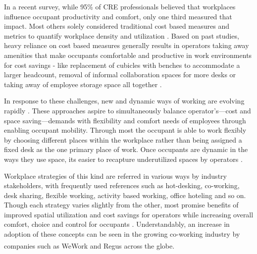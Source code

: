 \documentclass[]{interact}
\theoremstyle{plain}%
\theoremstyle{definition}
\theoremstyle{remark}
\begin{document}
In a recent survey, while 95\% of CRE professionals believed that workplaces influence occupant productivity and comfort, only one third measured that impact. Most others solely considered traditional cost based measures and metrics to quantify workplace density and utilization \citep{gensler}. Based on past studies, heavy reliance on cost based measures generally results in operators taking away amenities that make occupants comfortable and productive in work environments for cost savings - like replacement of cubicles with benches to accommodate a larger headcount, removal of informal collaboration spaces for more desks or taking away of employee storage space all together \citep{cbre}.

 

In response to these challenges, new and dynamic ways of working are evolving rapidly . These approaches aspire to simultaneously balance operator's---cost and space saving---demands with flexibility and comfort needs of employees through enabling occupant mobility. Through most the occupant is able to work flexibly by choosing different places within the workplace rather than being assigned a fixed desk as the one primary place of work. Once occupants are dynamic in the ways they use space, its easier to recapture underutilized spaces by operators \citep{cbre}.


Workplace strategies of this kind are referred in various ways by industry stakeholders, with frequently used references such as hot-desking, co-working, desk sharing, flexible working, activity based working, office hoteling and so on. Though each strategy varies slightly from the other, most promise benefits of improved spatial utilization and cost savings for operators while increasing overall comfort, choice and control for occupants \citep{Engelen2018IsReview}. Understandably, an increase in adoption of these concepts can be seen in the growing co-working industry by companies such as WeWork\textsuperscript{\textregistered} and Regus\textsuperscript{\textregistered} across the globe.  %
\end{document}
